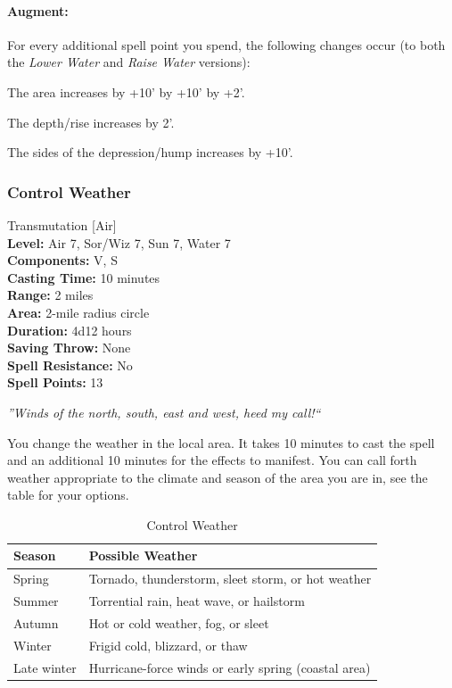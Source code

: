 \paragraph{Augment:} For every additional spell point you spend, the following changes occur (to both the \emph{Lower Water} and \emph{Raise Water} versions):
\begin{list}{}{\leftmargin=1em}
 \item The area increases by +10' by +10' by +2'.
 \item The depth/rise increases by 2'.
 \item The sides of the depression/hump increases by +10'.
\end{list}
\subsubsection{Control Weather}
\label{Spell:ControlWeather}
Transmutation [Air]
\\ \textbf{Level:} Air 7, Sor/Wiz 7, Sun 7, Water 7
\\ \textbf{Components:} V, S
\\ \textbf{Casting Time:} 10 minutes
\\ \textbf{Range:} 2 miles
\\ \textbf{Area:} 2-mile radius circle
\\ \textbf{Duration:} 4d12 hours
\\ \textbf{Saving Throw:} None
\\ \textbf{Spell Resistance:} No
\\ \textbf{Spell Points:} 13

\emph{''Winds of the north, south, east and west, heed my call!``}

You change the weather in the local area. 
It takes 10 minutes to cast the spell and an additional 10 minutes for the effects to manifest. 
You can call forth weather appropriate to the climate and season of the area you are in, see the  table for your options.
\begin{table}
\caption{Control Weather}
\label{tab:ControlWeather}
\begin{center}
\begin{tabular}{|l|l|}
\hline
Season &Possible Weather\\
\hline
Spring &Tornado, thunderstorm, sleet storm, or hot weather\\
Summer &Torrential rain, heat wave, or hailstorm\\
Autumn &Hot or cold weather, fog, or sleet\\
Winter &Frigid cold, blizzard, or thaw\\
Late winter &Hurricane-force winds or early spring (coastal area)\\
\hline
\end{tabular}
\end{center}
\end{table}

